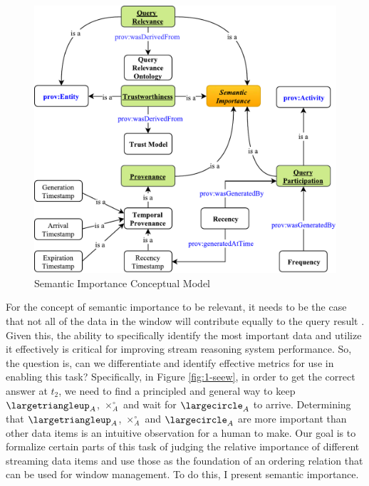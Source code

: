 \begin{figure}[!htbp]
	\centering
	\includegraphics[width=5in]{img/3-si.pdf}
	\caption{Semantic Importance Conceptual Model}
	\label{fig:3-si} 
\end{figure}

For the concept of semantic importance to be relevant, it needs to be the case that not all of the data in the window will contribute equally to the query result \cite{mileo2013streamrule}. 
Given this, the ability to specifically identify the most important data and utilize it effectively is critical for improving stream reasoning system performance. 
So, the question is, can we differentiate and identify effective metrics for use in enabling this task? 
Specifically, in Figure \ref{fig:1-seew}, in order to get the correct answer at $t_{2}$, we need to find a principled and general way to keep $\largetriangleup_{A}$, $\times^{\circ}_{A}$ and wait for $\largecircle_{A}$ to arrive. 
Determining that $\largetriangleup_{A}$, $\times^{\circ}_{A}$ and $\largecircle_{A}$ are more important than other data items is an intuitive observation for a human to make. 
Our goal is to formalize certain parts of this task of judging the relative importance of different streaming data items and use those as the foundation of an ordering relation that can be used for window management.
To do this, I present semantic importance.

